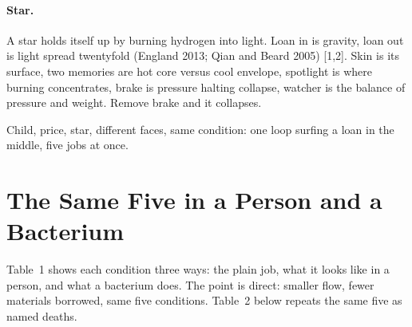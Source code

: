 \documentclass[11pt,a4paper]{article}
\begin{document}
\paragraph{Star.} A star holds itself up by burning hydrogen into light. Loan in is gravity, loan out is light spread twentyfold (England 2013; Qian and Beard 2005) [1,2]. Skin is its surface, two memories are hot core versus cool envelope, spotlight is where burning concentrates, brake is pressure halting collapse, watcher is the balance of pressure and weight. Remove brake and it collapses.

Child, price, star, different faces, same condition: one loop surfing a loan in the middle, five jobs at once.

\section{The Same Five in a Person and a Bacterium}

Table~1 shows each condition three ways: the plain job, what it looks like in a person, and what a bacterium does. The point is direct: smaller flow, fewer materials borrowed, same five conditions. Table~2 below repeats the same five as named deaths.
\end{document}
